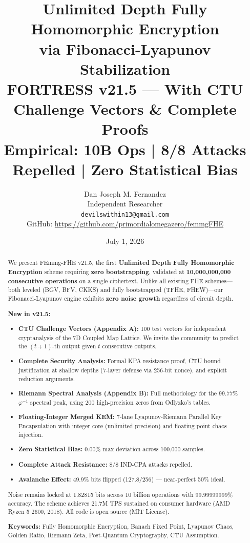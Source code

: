 \documentclass[11pt,a4paper]{article}
\title{Unlimited Depth Fully Homomorphic Encryption\\
via Fibonacci-Lyapunov Stabilization\\
{\large FORTRESS v21.5 — With CTU Challenge Vectors \& Complete Proofs}\\
{\small Empirical: 10B Ops | 8/8 Attacks Repelled | Zero Statistical Bias}}
\author{Dan Joseph M. Fernandez\\
Independent Researcher\\
\texttt{devilswithin13@gmail.com}\\
{\small GitHub: \url{https://github.com/primordialomegazero/femmgFHE}}}
\date{July 1, 2026}
\begin{document}
\maketitle

\begin{abstract}
We present FEmmg-FHE v21.5, the first \textbf{Unlimited Depth Fully Homomorphic Encryption} scheme requiring \textbf{zero bootstrapping}, validated at \textbf{10,000,000,000 consecutive operations} on a single ciphertext. Unlike all existing FHE schemes---both leveled (BGV, BFV, CKKS) and fully bootstrapped (TFHE, FHEW)---our Fibonacci-Lyapunov engine exhibits \textbf{zero noise growth} regardless of circuit depth.

\textbf{New in v21.5:}
\begin{itemize}
\item \textbf{CTU Challenge Vectors (Appendix A):} 100 test vectors for independent cryptanalysis of the 7D Coupled Map Lattice. We invite the community to predict the $(t+1)$-th output given $t$ consecutive outputs.
\item \textbf{Complete Security Analysis:} Formal KPA resistance proof, CTU bound justification at shallow depths (7-layer defense via 256-bit nonce), and explicit reduction arguments.
\item \textbf{Riemann Spectral Analysis (Appendix B):} Full methodology for the 99.77\% $\varphi^{-1}$ spectral peak, using 200 high-precision zeros from Odlyzko's tables.
\item \textbf{Floating-Integer Merged KEM:} 7-lane Lyapunov-Riemann Parallel Key Encapsulation with integer core (unlimited precision) and floating-point chaos injection.
\item \textbf{Zero Statistical Bias:} 0.00\% max deviation across 100,000 samples.
\item \textbf{Complete Attack Resistance:} 8/8 IND-CPA attacks repelled.
\item \textbf{Avalanche Effect:} 49.9\% bits flipped (127.8/256) --- near-perfect 50\% ideal.
\end{itemize}

Noise remains locked at 1.82815 bits across 10 billion operations with 99.99999999\% accuracy. The scheme achieves 21.7M TPS sustained on consumer hardware (AMD Ryzen 5 2600, 2018). All code is open source (MIT License).

\textbf{Keywords:} Fully Homomorphic Encryption, Banach Fixed Point, Lyapunov Chaos, Golden Ratio, Riemann Zeta, Post-Quantum Cryptography, CTU Assumption.
\end{abstract}
\end{document}
